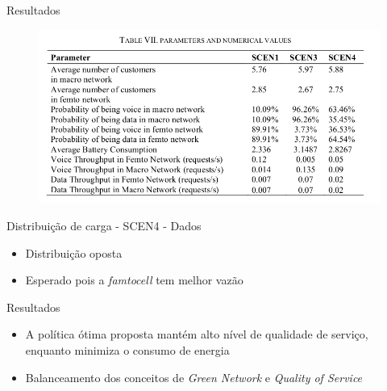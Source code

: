 \begin{frame}{Resultados}
  \begin{figure}[h]
  	\begin{center}
      \includegraphics [scale=0.34]{./Figures/results}
  	\end{center}
  \end{figure}
  \begin{block}{Distribuição de carga - SCEN4 - \alert{Dados}}
    \begin{itemize}
      \item Distribuição oposta
      \item Esperado pois a \textit{famtocell} tem melhor vazão
    \end{itemize}
  \end{block}
\end{frame}

\begin{frame}{Resultados}
  \begin{block}{}
    \begin{itemize}
      \item A política ótima proposta mantém alto nível de qualidade de
      serviço, enquanto minimiza o consumo de energia
      \item Balanceamento dos conceitos de \textit{Green Network} e
      \textit{Quality of Service}
    \end{itemize}
  \end{block}
\end{frame}


